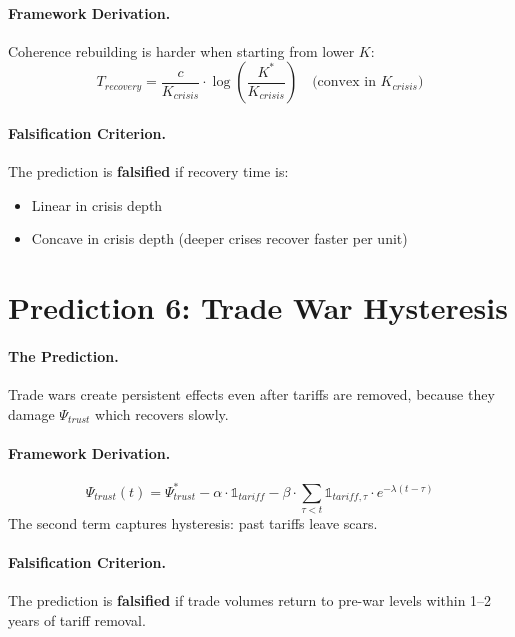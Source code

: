 \paragraph{Framework Derivation.}
Coherence rebuilding is harder when starting from lower $K$:
\begin{equation}
    T_{recovery} = \frac{c}{K_{crisis}} \cdot \log\left(\frac{K^*}{K_{crisis}}\right) \quad \text{(convex in } K_{crisis}\text{)}
\end{equation}

\paragraph{Falsification Criterion.}
The prediction is \textbf{falsified} if recovery time is:
\begin{itemize}
    \item Linear in crisis depth
    \item Concave in crisis depth (deeper crises recover faster per unit)
\end{itemize}


\section{Prediction 6: Trade War Hysteresis}
\label{sec:S-prediction6}

\paragraph{The Prediction.}
Trade wars create persistent effects even after tariffs are removed, because they damage $\Psi_{trust}$ which recovers slowly.

\paragraph{Framework Derivation.}
\begin{equation}
    \Psi_{trust}(t) = \Psi_{trust}^* - \alpha \cdot \mathbb{1}_{tariff} - \beta \cdot \sum_{\tau < t} \mathbb{1}_{tariff,\tau} \cdot e^{-\lambda(t-\tau)}
\end{equation}
The second term captures hysteresis: past tariffs leave scars.

\paragraph{Falsification Criterion.}
The prediction is \textbf{falsified} if trade volumes return to pre-war levels within 1--2 years of tariff removal.


